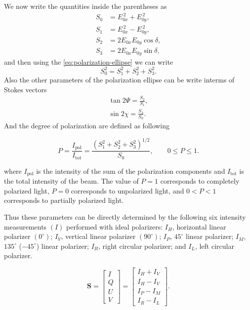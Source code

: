 We now write the quantities inside the parentheses as
\begin{subequations}
    \begin{align}
    S_0 &= E_{0x}^{\,2} + E_{0y}^{\,2}, \label{eq:S_0}\\
    S_1 &= E_{0x}^{\,2} - E_{0y}^{\,2}, \label{eq:S_1}\\
    S_2 &= 2E_{0x}E_{0y}\cos\delta, \label{eq:S_2}\\
    S_3 &= 2E_{0x}E_{0y}\sin\delta, \label{eq:S_3}
    \end{align}
\end{subequations}
and then using the \cref{eq:polarization-ellipse} we can write
\begin{equation}
S_0^{2} = S_1^{2} + S_2^{2} + S_3^{2}.
\end{equation}
Also the other parameters of the polarization ellipse can be write interms of Stokes vectors
\begin{subequations}
    \begin{align}
        \tan{2\Psi} = \frac{S_{2}}{S_{1}}, \\
        \sin{2\chi} = \frac{S_{3}}{S_{0}}.
    \end{align}
\end{subequations}
And the degree of polarization are defined as following

\begin{equation}
P = \frac{I_{\mathrm{pol}}}{I_{\mathrm{tot}}}
= \frac{\left(S_1^{2}+S_2^{2}+S_3^{2}\right)^{1/2}}{S_0},
\qquad 0 \le P \le 1 .
\end{equation}

where $I_{\mathrm{pol}}$ is the intensity of the sum of the polarization components and $I_{\mathrm{tot}}$ is the total intensity of the beam. The value of $P=1$ corresponds to completely polarized light, $P=0$ corresponds to unpolarized light, and $0<P<1$ corresponds to partially polarized light.

Thus these parameters can be directly determined by the following six intensity measurements $(I)$ performed with ideal polarizers: $I_H$, horizontal linear polarizer $(0^\circ)$; $I_V$, vertical linear polarizer $(90^\circ)$; $I_P$, $45^\circ$ linear polarizer; $I_M$, $135^\circ$ ($-45^\circ$) linear polarizer; $I_R$, right circular polarizer; and $I_L$, left
circular polarizer.

\begin{equation}
\mathbf{S} =
\begin{bmatrix}
I \\ Q \\ U \\ V
\end{bmatrix}
=
\begin{bmatrix}
I_H + I_V \\
I_H - I_V \\
I_P - I_M \\
I_R - I_L
\end{bmatrix}.
\end{equation}

